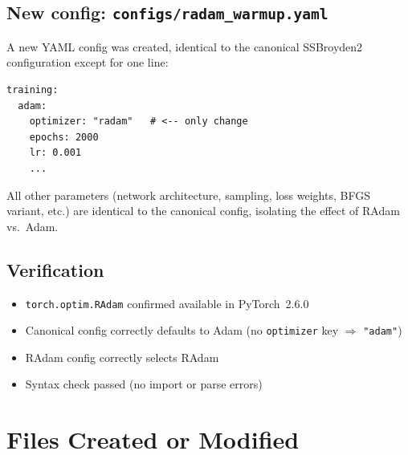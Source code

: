 \documentclass[11pt,a4paper]{article}
\begin{document}
\subsection{New config: \texttt{configs/radam\_warmup.yaml}}

A new YAML config was created, identical to the canonical SSBroyden2
configuration except for one line:
\begin{lstlisting}[language={},caption={RAdam config change}]
training:
  adam:
    optimizer: "radam"   # <-- only change
    epochs: 2000
    lr: 0.001
    ...
\end{lstlisting}

All other parameters (network architecture, sampling, loss weights,
BFGS variant, etc.) are identical to the canonical config, isolating
the effect of RAdam vs.\ Adam.

\subsection{Verification}

\begin{itemize}[nosep]
  \item \texttt{torch.optim.RAdam} confirmed available in PyTorch~2.6.0
  \item Canonical config correctly defaults to Adam (no
        \texttt{optimizer} key $\Rightarrow$ \texttt{"adam"})
  \item RAdam config correctly selects RAdam
  \item Syntax check passed (no import or parse errors)
\end{itemize}


\section{Files Created or Modified}
\label{sec:files}
\end{document}
